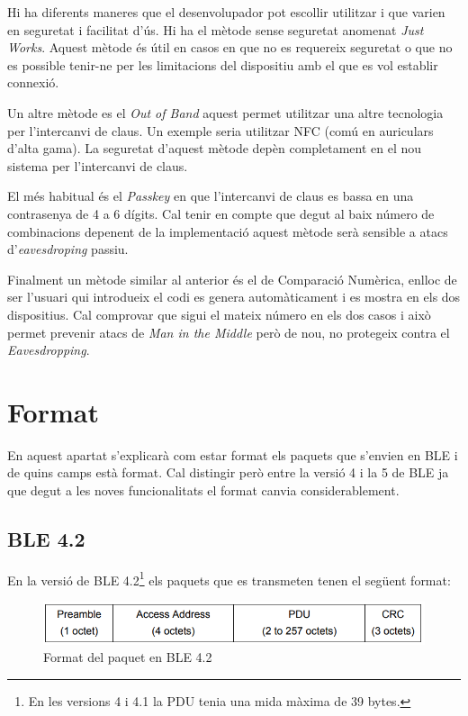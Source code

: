 Hi ha diferents maneres que el desenvolupador pot escollir utilitzar i que varien en seguretat i facilitat d'ús.
Hi ha el mètode sense seguretat anomenat \textit{Just Works}.
Aquest mètode és útil en casos en que no es requereix seguretat o que no es possible tenir-ne per les limitacions del dispositiu amb el que es vol establir connexió.

Un altre mètode es el \textit{Out of Band} aquest permet utilitzar una altre tecnologia per l'intercanvi de claus.
Un exemple seria utilitzar NFC (comú en auriculars d'alta gama).
La seguretat d'aquest mètode depèn completament en el nou sistema per l'intercanvi de claus.

El més habitual és el \textit{Passkey} en que l'intercanvi de claus es bassa en una contrasenya de 4 a 6 dígits.
Cal tenir en compte que degut al baix número de combinacions depenent de la implementació aquest mètode serà sensible a atacs d'\textit{eavesdroping} passiu.

Finalment un mètode similar al anterior és el de Comparació Numèrica, enlloc de ser l'usuari qui introdueix el codi es genera automàticament i es mostra en els dos dispositius.
Cal comprovar que sigui el mateix número en els dos casos i això permet prevenir atacs de \textit{Man in the Middle} però de nou, no protegeix contra el \textit{Eavesdropping}.

\section{Format}
\label{sec:format}
En aquest apartat s'explicarà com estar format els paquets que s'envien en BLE i de quins camps està format.
Cal distingir però entre la versió 4 i la 5 de BLE ja que degut a les noves funcionalitats el format canvia considerablement.

\subsection{BLE 4.2}
En la versió de BLE 4.2\footnote{En les versions 4 i 4.1 la PDU tenia una mida màxima de 39 bytes.} els paquets que es transmeten tenen el següent format:

\begin{figure}[!h]
	\begin{center}
		\includegraphics[width=1\textwidth]{./images/Packet_format_4_2.png}
		\caption{Format del paquet en BLE 4.2 \cite{BLE_4.2_packet_format}}
	\end{center}
\end{figure}

